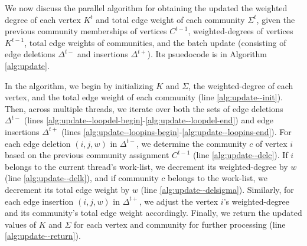 We now discuss the parallel algorithm for obtaining the updated the weighted degree of each vertex $K^t$ and total edge weight of each community $\Sigma^t$, given the previous community memberships of vertices $C^{t-1}$, weighted-degrees of vertices $K^{t-1}$, total edge weights of communities, and the batch update (consisting of edge deletions $\Delta^{t-}$ and insertions $\Delta^{t+}$). Its psuedocode is in Algorithm \ref{alg:update}.



In the algorithm, we begin by initializing $K$ and $\Sigma$, the weighted-degree of each vertex, and the total edge weight of each community (line \ref{alg:update--init}). Then, across multiple threads, we iterate over both the sets of edge deletions $\Delta^{t-}$ (lines \ref{alg:update--loopdel-begin}-\ref{alg:update--loopdel-end}) and edge insertions $\Delta^{t+}$ (lines \ref{alg:update--loopins-begin}-\ref{alg:update--loopins-end}). For each edge deletion $(i, j, w)$ in $\Delta^{t-}$, we determine the community $c$ of vertex $i$ based on the previous community assignment $C^{t-1}$ (line \ref{alg:update--delc}). If $i$ belongs to the current thread's work-list, we decrement its weighted-degree by $w$ (line \ref{alg:update--delk}), and if community $c$ belongs to the work-list, we decrement its total edge weight by $w$ (line \ref{alg:update--delsigma}). Similarly, for each edge insertion $(i, j, w)$ in $\Delta^{t+}$, we adjust the vertex $i$'s weighted-degree and its community's total edge weight accordingly. Finally, we return the updated values of $K$ and $\Sigma$ for each vertex and community for further processing (line \ref{alg:update--return}).








